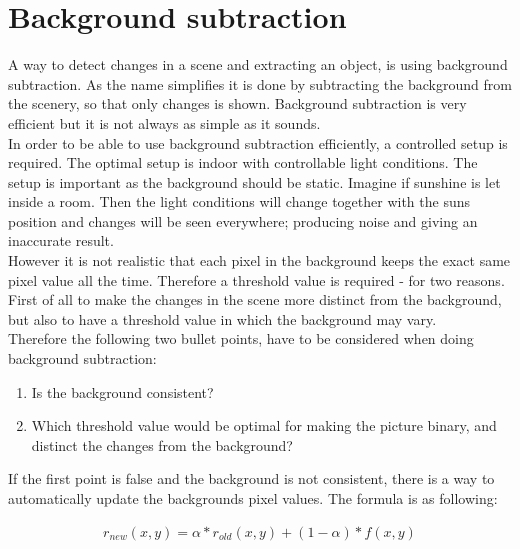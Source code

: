 \section{Background subtraction}
A way to detect changes in a scene and extracting an object, is using background subtraction. As the name simplifies it is done by subtracting the background from the scenery, so that only changes is shown. Background subtraction is very efficient but it is not always as simple as it sounds. \\
In order to be able to use background subtraction efficiently, a controlled setup is required. The optimal setup is indoor with controllable light conditions. The setup is important as the background should be static. Imagine if sunshine is let inside a room. Then the light conditions will change together with the suns position and changes will be seen everywhere; producing noise and giving an inaccurate result. \\
However it is not realistic that each pixel in the background keeps the exact same pixel value all the time. Therefore a threshold value is required - for two reasons. First of all to make the changes in the scene more distinct from the background, but also to have a threshold value in which the background may vary. \\
Therefore the following two bullet points, have to be considered when doing background subtraction:
\begin{enumerate} 
	\item Is the background consistent? 
	\item Which threshold value would be optimal for making the picture binary, and distinct the changes from the background? 
\end{enumerate}

If the first point is false and the background is not consistent, there is a way to automatically update the backgrounds pixel values. The formula is as following:

\begin{equation}
	\begin{aligned}
  		r_{new}(x,y)=\alpha*r_{old}(x,y)+(1-\alpha)*f(x,y)
		\label{AutomaticBackground}  
 	\end{aligned}
\end{equation}  

